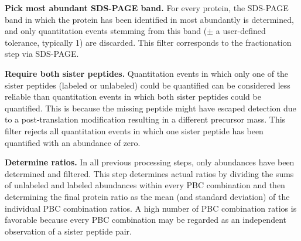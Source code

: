 {\bf Pick most abundant SDS-PAGE band.}
For every protein, the SDS-PAGE band in which the protein has been identified 
in most abundantly is determined, and only quantitation events stemming from 
this band ($\pm$ a user-defined tolerance, typically 1) are discarded. This 
filter corresponds to the fractionation step via SDS-PAGE.

{\bf Require both sister peptides.}
Quantitation events in which only one of the sister peptides (labeled or 
unlabeled) could be quantified can be considered less reliable than quantitation 
events in which both sister peptides could be quantified.
This is because the missing peptide might have escaped detection due to a 
post-translation modification resulting in a different precursor mass. 
This filter rejects all quantitation events in which one sister peptide has 
been quantified with an abundance of zero.

{\bf Determine ratios.}
In all previous processing steps, only abundances have been determined and 
filtered. 
This step determines actual ratios by dividing the sums of unlabeled and 
labeled abundances within every PBC combination and then determining the final 
protein ratio as the mean (and standard deviation) of the individual PBC 
combination ratios.
A high number of PBC combination ratios is favorable because every PBC 
combination may be regarded as an independent observation of a sister peptide 
pair.
